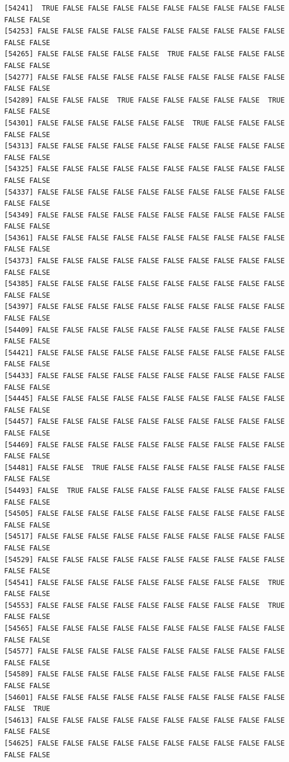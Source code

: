 \documentclass[
  a4paper,
  DIV=11,
  numbers=noendperiod]{scrartcl}
\begin{document}
\begin{verbatim}
[54241]  TRUE FALSE FALSE FALSE FALSE FALSE FALSE FALSE FALSE FALSE FALSE FALSE
[54253] FALSE FALSE FALSE FALSE FALSE FALSE FALSE FALSE FALSE FALSE FALSE FALSE
[54265] FALSE FALSE FALSE FALSE FALSE  TRUE FALSE FALSE FALSE FALSE FALSE FALSE
[54277] FALSE FALSE FALSE FALSE FALSE FALSE FALSE FALSE FALSE FALSE FALSE FALSE
[54289] FALSE FALSE FALSE  TRUE FALSE FALSE FALSE FALSE FALSE  TRUE FALSE FALSE
[54301] FALSE FALSE FALSE FALSE FALSE FALSE  TRUE FALSE FALSE FALSE FALSE FALSE
[54313] FALSE FALSE FALSE FALSE FALSE FALSE FALSE FALSE FALSE FALSE FALSE FALSE
[54325] FALSE FALSE FALSE FALSE FALSE FALSE FALSE FALSE FALSE FALSE FALSE FALSE
[54337] FALSE FALSE FALSE FALSE FALSE FALSE FALSE FALSE FALSE FALSE FALSE FALSE
[54349] FALSE FALSE FALSE FALSE FALSE FALSE FALSE FALSE FALSE FALSE FALSE FALSE
[54361] FALSE FALSE FALSE FALSE FALSE FALSE FALSE FALSE FALSE FALSE FALSE FALSE
[54373] FALSE FALSE FALSE FALSE FALSE FALSE FALSE FALSE FALSE FALSE FALSE FALSE
[54385] FALSE FALSE FALSE FALSE FALSE FALSE FALSE FALSE FALSE FALSE FALSE FALSE
[54397] FALSE FALSE FALSE FALSE FALSE FALSE FALSE FALSE FALSE FALSE FALSE FALSE
[54409] FALSE FALSE FALSE FALSE FALSE FALSE FALSE FALSE FALSE FALSE FALSE FALSE
[54421] FALSE FALSE FALSE FALSE FALSE FALSE FALSE FALSE FALSE FALSE FALSE FALSE
[54433] FALSE FALSE FALSE FALSE FALSE FALSE FALSE FALSE FALSE FALSE FALSE FALSE
[54445] FALSE FALSE FALSE FALSE FALSE FALSE FALSE FALSE FALSE FALSE FALSE FALSE
[54457] FALSE FALSE FALSE FALSE FALSE FALSE FALSE FALSE FALSE FALSE FALSE FALSE
[54469] FALSE FALSE FALSE FALSE FALSE FALSE FALSE FALSE FALSE FALSE FALSE FALSE
[54481] FALSE FALSE  TRUE FALSE FALSE FALSE FALSE FALSE FALSE FALSE FALSE FALSE
[54493] FALSE  TRUE FALSE FALSE FALSE FALSE FALSE FALSE FALSE FALSE FALSE FALSE
[54505] FALSE FALSE FALSE FALSE FALSE FALSE FALSE FALSE FALSE FALSE FALSE FALSE
[54517] FALSE FALSE FALSE FALSE FALSE FALSE FALSE FALSE FALSE FALSE FALSE FALSE
[54529] FALSE FALSE FALSE FALSE FALSE FALSE FALSE FALSE FALSE FALSE FALSE FALSE
[54541] FALSE FALSE FALSE FALSE FALSE FALSE FALSE FALSE FALSE  TRUE FALSE FALSE
[54553] FALSE FALSE FALSE FALSE FALSE FALSE FALSE FALSE FALSE  TRUE FALSE FALSE
[54565] FALSE FALSE FALSE FALSE FALSE FALSE FALSE FALSE FALSE FALSE FALSE FALSE
[54577] FALSE FALSE FALSE FALSE FALSE FALSE FALSE FALSE FALSE FALSE FALSE FALSE
[54589] FALSE FALSE FALSE FALSE FALSE FALSE FALSE FALSE FALSE FALSE FALSE FALSE
[54601] FALSE FALSE FALSE FALSE FALSE FALSE FALSE FALSE FALSE FALSE FALSE  TRUE
[54613] FALSE FALSE FALSE FALSE FALSE FALSE FALSE FALSE FALSE FALSE FALSE FALSE
[54625] FALSE FALSE FALSE FALSE FALSE FALSE FALSE FALSE FALSE FALSE FALSE FALSE

\end{verbatim}
\end{document}
